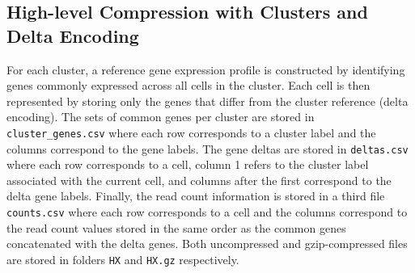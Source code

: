 \documentclass[unnumsec,webpdf,contemporary,large]{oup-authoring-template}
\begin{document}
\subsection{High-level Compression with Clusters and Delta Encoding}
For each cluster, a reference gene expression profile is constructed by identifying genes commonly expressed across all cells in the cluster. Each cell is then represented by storing only the genes that differ from the cluster reference (delta encoding). The sets of common genes per cluster are stored in \texttt{cluster\_genes.csv} where each row corresponds to a cluster label and the columns correspond to the gene labels. The gene deltas are stored in \texttt{deltas.csv} where each row corresponds to a cell, column 1 refers to the cluster label associated with the current cell, and columns after the first correspond to the delta gene labels. Finally, the read count information is stored in a third file \texttt{counts.csv} where each row corresponds to a cell and the columns correspond to the read count values stored in the same order as the common genes concatenated with the delta genes. Both uncompressed and gzip-compressed files are stored in folders \texttt{HX} and \texttt{HX.gz} respectively.
\end{document}
